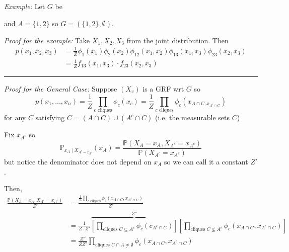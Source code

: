 \documentclass[12pt]{report}
\renewcommand{\P}{\mathbb{P}}
\newcommand{\sub}{\subseteq}
\renewcommand{\div}{\vspace*{10pt}\hrule\vspace*{10pt}}
\newenvironment*{tbox}[2][gray]{
    \begin{tcolorbox}[
        parbox=false,
        colback=#1!5!white,
        colframe=#1!75!black,
        breakable,
        title={#2}
    ]}
    {\end{tcolorbox}}
\begin{document}
\begin{tbox}{\textbf{Theorem:} Let  $(X_v)_{v \in G}$ be aGRF wrt a graph $G$ if $A \sub V(G)$. Conditioned on $X_{A^c}$, the rv $X_A$ is a GRF wrt the induced graph on $A$, i.e. $v \overset{G'}{\sim} u$ in this graph iff $v, u \in A$ and $v\overset{G}{\sim} u$. }
    \emph{Example:} Let $G$ be
    \begin{center}
    \end{center}
    and $A = \{1, 2\}$ so $G = (\{1, 2\}, \emptyset)$.

    \emph{Proof for the example:} Take $X_1, X_2, X_3$ from the joint distribution. Then
    \begin{align*}
        p(x_1, x_2, x_3) & = \frac{1}{Z}\phi_1(x_1) \phi_2(x_2) \phi_{12}(x_1, x_2) \phi_{13}(x_1, x_3) \phi_{23}(x_2, x_3) \\
                         & = \frac{1}{Z} f_{13}(x_1, x_3) \cdot f_{23}(x_2, x_3)
    \end{align*}

    \div

    \emph{Proof for the General Case:} Suppose $(X_v)$ is a GRF wrt $G$ so
    \[p(x_1, \dots, x_n) = \frac{1}{Z} \prod_{c\text{ cliques}} \phi_c(x_c) = \frac{1}{Z} \prod_{c \text{ cliques}} \phi_c(x_{A \cap C, x_{A^c \cap C}})\]
    for any $C$ satisfying $C = (A \cap C) \cup (A^c \cap C)$ (i.e. the measurable sets $C$)

    Fix $x_{A^c}$ so
    \[\P_{x_A \; | \; X_{A^c = x_{A^c}}}(x_A) = \frac{\P(X_A = x_A, X_{A^c} = x_{A^c})}{\P(X_{A^c} = x_{A^c})}\]
    but notice the denominator does not depend on $x_A$ so we can call it a constant $Z'$.

    Then,
    \begin{align*}
        \frac{\P(X_A = x_A, X_{A^c} = x_{A^c})}{Z'} & = \frac{\frac{1}{Z} \prod_{c \text{ cliques}} \phi_c(x_{A \cap C}, x_{A^c \cap C})}{Z'}                                                                                                                 \\
                                                    & = \frac{1}{Z \cdot Z'} \overbrace{\left[\prod_{\text{cliques } C \sub A^c} \phi_c(c_{A^c \cap C})\right]}^{Z''}\left[\prod_{\text{cliques } C \not\sub A^c} \phi_c(x_{A \cap C}, x_{A^c \cap C})\right] \\
                                                    & = \frac{Z''}{ZZ'} \prod_{\text{cliques } C \cap A \neq \emptyset} \phi_c(x_{A \cap C}, x_{A^c \cap C})
    \end{align*}


\end{tbox}
\end{document}
